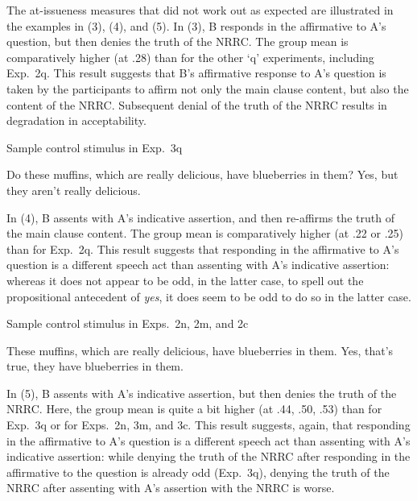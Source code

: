 \documentclass[11pt,fleqn]{article}
\newcommand{\6}{\mbox{$[\hspace*{-.6mm}[$}}
\newcommand{\9}{\mbox{$]\hspace*{-.6mm}]$}}
\begin{document}
\newpage

The at-issueness measures that did not work out as expected are illustrated in the examples in (3), (4), and (5). In (3), B responds in the affirmative to A's question, but then denies the truth of the NRRC. The group mean is comparatively higher (at .28) than for the other `q' experiments, including Exp.~2q. This result suggests that B's affirmative response to A's question is taken by the participants to affirm not only the main clause content, but also the content of the NRRC. Subsequent denial of the truth of the NRRC results in degradation in acceptability.

\begin{exe}
 Sample control stimulus in Exp.~3q
\begin{xlist}
 Do these muffins, which are really delicious, have blueberries in them?
 Yes, but they aren't really delicious.
\end{xlist}
\end{exe}

In (4), B assents with A's indicative assertion, and then re-affirms the truth of the main clause content. The group mean is comparatively higher (at .22 or .25) than for Exp.~2q. This result suggests that responding in the affirmative to A's question is a different speech act than assenting with A's indicative assertion: whereas it does not appear to be odd, in the latter case, to spell out the propositional antecedent of {\em yes}, it does seem to be odd to do so in the latter case.

\begin{exe}
 Sample control stimulus in Exps.~2n, 2m, and 2c
\begin{xlist}
 These muffins, which are really delicious, have blueberries in them.
 Yes, that's true, they have blueberries in them.
\end{xlist}
\end{exe}

In (5), B assents with A's indicative assertion, but then denies the truth of the NRRC. Here, the group mean is quite a bit higher (at .44, .50, .53) than for Exp.~3q or for Exps.~2n, 3m, and 3c. This result suggests, again, that responding in the affirmative to A's question is a different speech act than assenting with A's indicative assertion: while denying the truth of the NRRC after responding in the affirmative to the question is already odd (Exp.~3q), denying the truth of the NRRC after assenting with A's assertion with the NRRC is worse.
\end{document}
